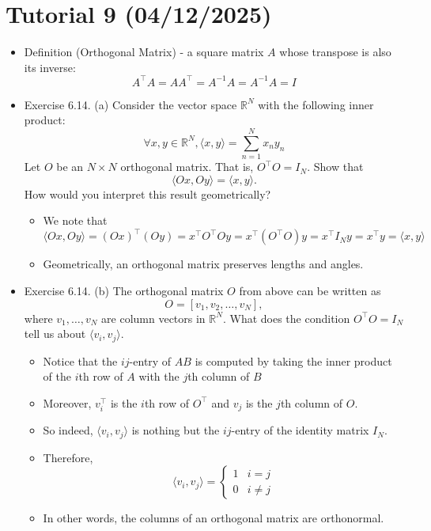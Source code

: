 \documentclass{article}
\begin{document}
\section{Tutorial 9 (04/12/2025)}
\begin{itemize}
    \item Definition (Orthogonal Matrix) - a square matrix $A$ whose transpose is also its inverse:
    \[
    A^\top A = A A^\top = A^{-1}A = A^{-1}A = I
    \]
    \item Exercise 6.14. (a) Consider the vector space $\mathbb{R}^N$ with the following inner product:
    \[
    \forall x,y \in \mathbb{R}^N, \langle x,y \rangle = \sum_{n=1}^N x_ny_n
    \]
    Let $O$ be an $N \times N$ orthogonal matrix. That is, $O^\top O = I_N$. Show that
    \[
    \langle Ox,Oy \rangle = \langle x,y \rangle.
    \]
    How would you interpret this result geometrically?
    \begin{itemize}
        \item We note that
        \[
        \langle Ox,Oy \rangle = (Ox)^\top(Oy) = x^\top O^\top O y = x^\top (O^\top O) y = x^\top I_N y = x^\top y = \langle x,y \rangle
        \]
        \item Geometrically, an orthogonal matrix preserves lengths and angles.
    \end{itemize}
    \item Exercise 6.14. (b) The orthogonal matrix $O$ from above can be written as
    \[
    O = [v_1,v_2,\dots,v_N],
    \]
    where $v_1,\dots,v_N$ are column vectors in $\mathbb{R}^N$. What does the condition $O^\top O = I_N$ tell us about $\langle v_i,v_j\rangle$.
    \begin{itemize}
        \item Notice that the $ij$-entry of $AB$ is computed by taking the inner product of the $i$th row of $A$ with the $j$th column of $B$
        \item Moreover, $v_i^\top$ is the $i$th row of $O^\top$ and $v_j$ is the $j$th column of $O$.
        \item So indeed, $\langle v_i,v_j\rangle$ is nothing but the $ij$-entry of the identity matrix $I_N$.
        \item Therefore,
        \[
        \langle v_i,v_j \rangle = \left\{ \begin{array}{lr}
            1 & i=j \\
            0 & i \neq j
        \end{array} \right.
        \]
        \item In other words, the columns of an orthogonal matrix are orthonormal.

\end{itemize}
\end{itemize}
\end{document}
